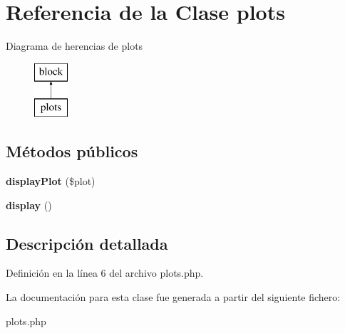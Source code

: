 \hypertarget{classplots}{\section{\-Referencia de la \-Clase plots}
\label{classplots}
}
\-Diagrama de herencias de plots\begin{figure}[H]
\begin{center}
\leavevmode
\includegraphics[height=2.000000cm]{classplots}
\end{center}
\end{figure}
\subsection*{\-Métodos públicos}
\begin{DoxyCompactItemize}
\item 
\hypertarget{classplots_a2bbdf8344df94f2b1cfb51d6144d95f7}{{\bfseries display\-Plot} (\$plot)}\label{classplots_a2bbdf8344df94f2b1cfb51d6144d95f7}

\item 
\hypertarget{classplots_a96aa342680d985e274c53cddd3e39978}{{\bfseries display} ()}\label{classplots_a96aa342680d985e274c53cddd3e39978}

\end{DoxyCompactItemize}


\subsection{\-Descripción detallada}


\-Definición en la línea 6 del archivo plots.\-php.



\-La documentación para esta clase fue generada a partir del siguiente fichero\-:\begin{DoxyCompactItemize}
\item 
plots.\-php\end{DoxyCompactItemize}
